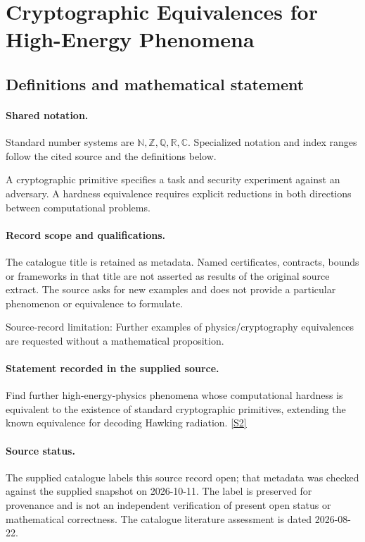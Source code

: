 \documentclass[11pt]{article}
\newcommand{\sref}[2]{\hyperlink{source:#1:#2}{[S#2]}}
\begin{document}
\section{Cryptographic Equivalences for High-Energy Phenomena}\label{statement}

\subsection{Definitions and mathematical statement}

\paragraph{Shared notation.}Standard number systems are $\mathbb N,\mathbb Z,\mathbb Q,\mathbb R,\mathbb C$. Specialized notation and index ranges follow the cited source and the definitions below.


A cryptographic primitive specifies a task and security experiment against an adversary. A hardness equivalence requires explicit reductions in both directions between computational problems.
\paragraph{Record scope and qualifications.}
The catalogue title is retained as metadata. Named certificates, contracts, bounds or frameworks in that title are not asserted as results of the original source extract.
The source asks for new examples and does not provide a particular phenomenon or equivalence to formulate.

Source-record limitation: Further examples of physics/cryptography equivalences are requested without a mathematical proposition.
\paragraph{Statement recorded in the supplied source.}
Find further high-energy-physics phenomena whose computational hardness is equivalent to the existence of standard cryptographic primitives, extending the known equivalence for decoding Hawking radiation. \sref{statement}{2}
\paragraph{Source status.}
The supplied catalogue labels this source record open; that metadata was checked against the supplied snapshot on 2026-10-11. The label is preserved for provenance and is not an independent verification of present open status or mathematical correctness. The catalogue literature assessment is dated 2026-08-22.
\end{document}
